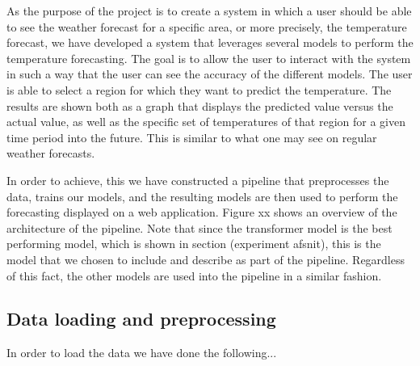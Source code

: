 As the purpose of the project is to create a system in which a user should be able to see the weather forecast for a specific area, or more precisely, the temperature forecast, we have developed a system that leverages several models to perform the temperature forecasting. 
The goal is to allow the user to interact with the system in such a way that the user can see the accuracy of the different models. 
The user is able to select a region for which they want to predict the temperature. The results are shown both as a graph that displays the predicted value versus the actual value, as well as the specific set of temperatures of that region for a given time period into the future. This is similar to what one may see on regular weather forecasts.

In order to achieve, this we have constructed a pipeline that preprocesses the data, trains our models, and the resulting models are then used to perform the forecasting displayed on a web application. 
Figure xx shows an overview of the architecture of the pipeline.
Note that since the transformer model is the best performing model, which is shown in section (experiment afsnit), this is the model that we chosen to include and describe as part of the pipeline. Regardless of this fact, the other models are used into the pipeline in a similar fashion.

\subsection{Data loading and preprocessing}
In order to load the data we have done the following...